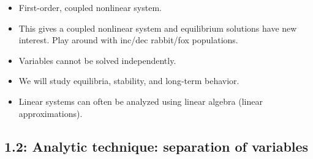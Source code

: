 \documentclass{article}
\begin{document}
\begin{enumerate}
\begin{enumerate}
\begin{itemize}
\item First-order, coupled nonlinear system.
\item This gives a coupled nonlinear system and equilibrium solutions have new interest. Play around with inc/dec rabbit/fox populations.
\item Variables cannot be solved independently.
\item We will study equilibria, stability, and long-term behavior.
\item Linear systems can often be analyzed using linear algebra (linear approximations).
\end{itemize}

\end{enumerate}

\end{enumerate}

\subsection{1.2: Analytic technique: separation of variables}
\end{document}
